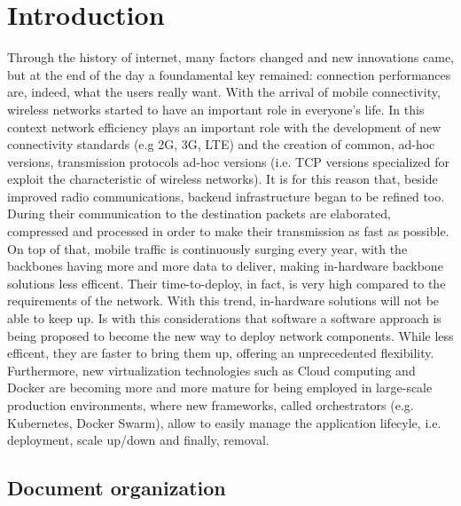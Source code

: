  
\chapter{Introduction}
\label{chap:intro}

 Through the history of internet, many factors changed and new innovations came,
 but at the end of the day a foundamental key remained: connection performances
 are, indeed, what the users really want.
With the arrival of mobile connectivity, wireless networks started to have an 
important role in everyone's life. In this context network efficiency plays 
an important role with the development of new connectivity standards (e.g 2G, 
3G, LTE) and the creation of common, ad-hoc versions, transmission protocols 
ad-hoc versions (i.e. TCP versions specialized for exploit the characteristic of 
wireless networks). It is for this reason that, beside improved radio 
communications, backend infrastructure began to be refined too. During their 
communication to the destination packets are elaborated, compressed and 
processed in order to make their transmission as fast as possible.
On top of that, mobile traffic is continuously surging every year, with the 
backbones having more and more data to deliver, making in-hardware backbone 
solutions less efficent. Their time-to-deploy, in fact, is very high compared 
to the requirements of the network. With this trend, in-hardware solutions 
will not be able to keep up. Is with this considerations that software a 
software approach is being proposed to become the new way to deploy network 
components. While less efficent, they are faster to bring them up, offering an 
unprecedented flexibility.
 Furthermore, new virtualization technologies such as Cloud computing and Docker
 are becoming more and more mature for being employed in large-scale production
 environments, where new frameworks, called orchestrators (e.g. Kubernetes,
 Docker Swarm), allow to easily manage the application lifecyle, i.e.
 deployment, scale up/down and finally, removal.
 
 \section{Document organization}
 

